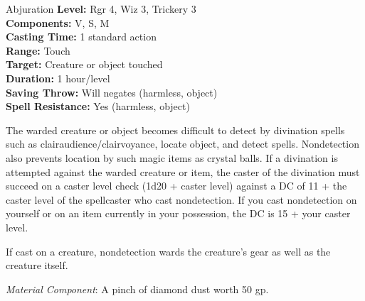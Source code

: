 {Abjuration}
{
	\textbf{Level:}
	Rgr 4, Wiz 3, Trickery 3\\
	\textbf{Components:}
	V, S, M\\
	\textbf{Casting Time:}
	1 standard action\\
	\textbf{Range:}
	Touch\\
	\textbf{Target:}
	Creature or object touched\\
	\textbf{Duration:}
	1 hour/level\\
	\textbf{Saving Throw:}
	Will negates (harmless, object)\\
	\textbf{Spell Resistance:}
	Yes (harmless, object)\\
}
{
	The warded creature or object becomes difficult to detect by divination spells such as clairaudience/clairvoyance, locate object, and detect spells. Nondetection also prevents location by such magic items as crystal balls. If a divination is attempted against the warded creature or item, the caster of the divination must succeed on a caster level check (1d20 + caster level) against a DC of 11 + the caster level of the spellcaster who cast nondetection. If you cast nondetection on yourself or on an item currently in your possession, the DC is 15 + your caster level.

	If cast on a creature, nondetection wards the creature's gear as well as the creature itself.

	\textit{Material Component}:
	A pinch of diamond dust worth 50 gp.

}
